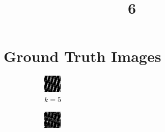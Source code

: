 \documentclass[a4paper, landscape]{article}
\title{6}
\date{}
\begin{document}
\maketitle
\section{Ground Truth Images}
\begin{figure}[H]
    \centering
    \begin{subfigure}{0.12\linewidth}
        \centering
        \includegraphics[width=\linewidth]{k = 5.png}
        \caption{$k = 5$}
    \end{subfigure}
    \begin{subfigure}{0.12\linewidth}
        \centering
        \includegraphics[width=\linewidth]{k = 10.png}

\end{subfigure}
\end{figure}
\end{document}

